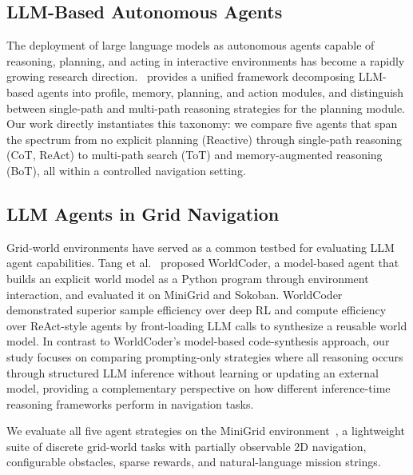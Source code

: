 
\subsection{LLM-Based Autonomous Agents}

The deployment of large language models as autonomous agents capable of reasoning, planning, and acting in interactive environments has become a rapidly growing research direction.~\cite{wang2024llmagentsurvey} provides a unified framework decomposing LLM-based agents into profile, memory, planning, and action modules, and distinguish between single-path and multi-path reasoning strategies for the planning module. Our work directly instantiates this taxonomy: we compare five agents that span the spectrum from no explicit planning (Reactive) through single-path reasoning (CoT, ReAct) to multi-path search (ToT) and memory-augmented reasoning (BoT), all within a controlled navigation setting.

\subsection{LLM Agents in Grid Navigation}

Grid-world environments have served as a common testbed for evaluating LLM agent capabilities. Tang et al.~\cite{tang2024worldcoder} proposed WorldCoder, a model-based agent that builds an explicit world model as a Python program through environment interaction, and evaluated it on MiniGrid and Sokoban. WorldCoder demonstrated superior sample efficiency over deep RL and compute efficiency over ReAct-style agents by front-loading LLM calls to synthesize a reusable world model. In contrast to WorldCoder's model-based code-synthesis approach, our study focuses on comparing prompting-only strategies where all reasoning occurs through structured LLM inference without learning or updating an external model, providing a complementary perspective on how different inference-time reasoning frameworks perform in navigation tasks.

We evaluate all five agent strategies on the MiniGrid environment~\cite{chevalier2023minigrid}, a lightweight suite of discrete grid-world tasks with partially observable 2D navigation, configurable obstacles, sparse rewards, and natural-language mission strings.